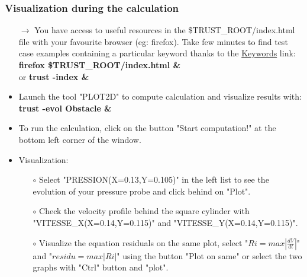 \documentclass[10pt, hyperref={unicode=true,pdfusetitle, bookmarks=true,bookmarksnumbered=false,bookmarksopen=false, breaklinks=false,pdfborder={0 0 1},backref=true,colorlinks=true,linkcolor=darkblue,pageanchor}]{beamer}
\begin{document}
\begin{frame}
\frametitle{Visualization during the calculation}
\begin{block}{}

\begin{itemize}
\item [$\rightarrow$] You have access to useful resources in the \$TRUST\_ROOT/index.html file with your favourite browser (eg: firefox). Take few minutes to find test case examples containing a particular keyword thanks to the \underline{Keywords} link: \\
\textbf{firefox \$TRUST\_ROOT/index.html \&} \\
or \textbf{trust -index \&}\\

\item Launch the tool "PLOT2D" to compute calculation and visualize results with: \\
\textbf{trust -evol Obstacle \&}

\item To run the calculation, click on the button "Start computation!" at the bottom left corner of the window.

\item Visualization:
    \begin{itemize}
    \item [$\circ$] Select "PRESSION(X=0.13,Y=0.105)" in the left list to see the evolution of your pressure probe and click behind on "Plot".
    \item [$\circ$] Check the velocity profile behind the square cylinder with "VITESSE\_X(X=0.14,Y=0.115)" and "VITESSE\_Y(X=0.14,Y=0.115)".
    \item [$\circ$] Visualize the equation residuals on the same plot, select "$ Ri = max \left| \frac{dV}{dt} \right|$" and "$residu = max \left| Ri \right|$" using the button "Plot on same" or select the two graphs with "Ctrl" button and "plot".
    \end{itemize}


\end{itemize}
\end{block}
\end{frame}
\end{document}
